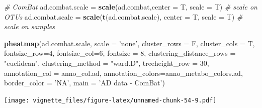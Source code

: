 \documentclass[]{book}
\newenvironment{Shaded}{\begin{snugshade}}{\end{snugshade}}
\newcommand{\KeywordTok}[1]{\textcolor[rgb]{0.13,0.29,0.53}{\textbf{#1}}}
\newcommand{\DataTypeTok}[1]{\textcolor[rgb]{0.13,0.29,0.53}{#1}}
\newcommand{\DecValTok}[1]{\textcolor[rgb]{0.00,0.00,0.81}{#1}}
\newcommand{\StringTok}[1]{\textcolor[rgb]{0.31,0.60,0.02}{#1}}
\newcommand{\CommentTok}[1]{\textcolor[rgb]{0.56,0.35,0.01}{\textit{#1}}}
\newcommand{\NormalTok}[1]{#1}
\begin{document}
\begin{Shaded}
\begin{Highlighting}[]
\CommentTok{# ComBat}
\NormalTok{ad.combat.scale =}\StringTok{ }\KeywordTok{scale}\NormalTok{(ad.combat,}\DataTypeTok{center =}\NormalTok{ T, }\DataTypeTok{scale =}\NormalTok{ T) }\CommentTok{# scale on OTUs}
\NormalTok{ad.combat.scale =}\StringTok{ }\KeywordTok{scale}\NormalTok{(}\KeywordTok{t}\NormalTok{(ad.combat.scale), }\DataTypeTok{center =}\NormalTok{ T, }\DataTypeTok{scale =}\NormalTok{ T) }\CommentTok{# scale on samples}

\KeywordTok{pheatmap}\NormalTok{(ad.combat.scale, }
         \DataTypeTok{scale =} \StringTok{'none'}\NormalTok{, }
         \DataTypeTok{cluster_rows =}\NormalTok{ F, }
         \DataTypeTok{cluster_cols =}\NormalTok{ T, }
         \DataTypeTok{fontsize_row=}\DecValTok{4}\NormalTok{, }\DataTypeTok{fontsize_col=}\DecValTok{6}\NormalTok{,}
         \DataTypeTok{fontsize =} \DecValTok{8}\NormalTok{,}
         \DataTypeTok{clustering_distance_rows =} \StringTok{"euclidean"}\NormalTok{,}
         \DataTypeTok{clustering_method =} \StringTok{"ward.D"}\NormalTok{,}
         \DataTypeTok{treeheight_row =} \DecValTok{30}\NormalTok{,}
         \DataTypeTok{annotation_col =}\NormalTok{ anno_col.ad,}
         \DataTypeTok{annotation_colors=}\NormalTok{anno_metabo_colors.ad,}
         \DataTypeTok{border_color =} \StringTok{'NA'}\NormalTok{,}
         \DataTypeTok{main =} \StringTok{'AD data - ComBat'}\NormalTok{)}
\end{Highlighting}
\end{Shaded}

\texttt{[image: vignette\_files/figure-latex/unnamed-chunk-54-9.pdf]}
\end{document}
